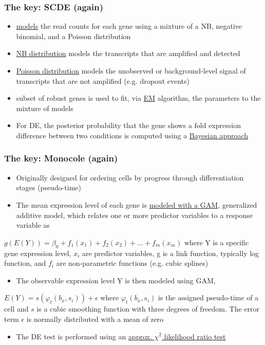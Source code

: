 \documentclass{beamer}\usepackage[]{graphicx}\usepackage[]{color}
\begin{document}
\begin{frame}
\frametitle{The key: SCDE (again)}
\begin{itemize}
  \item \underline{models} the read counts for each gene using a mixture of a NB, negative binomial, and a Poisson distribution 
  \item \underline{NB distribution} models the transcripts that are amplified and detected
  \item \underline{Poisson distribution} models the unobserved or background-level signal of transcripts that are not amplified (e.g. dropout events)
  \item subset of robust genes is used to fit, via \underline{EM} algorithm, the parameters to the mixture of models
  \item For DE, the posterior probability that the gene shows a fold expression difference between two conditions is computed using a \underline{Bayesian approach}
\end{itemize}
\end{frame}

\begin{frame}
\frametitle{The key: Monocole (again)}
\begin{itemize}
\item Originally designed for ordering cells by progress through differentiation stages (pseudo-time)
\item The mean expression level of each gene is \underline{modeled with a GAM}, generalized additive model, which relates one or more predictor variables to a response variable as  
\end{itemize}
   \begin{center}
    $g(E(Y))=\beta_0+f_1(x_1)+f_2(x_2)+...+f_m(x_m)$ where Y is a specific gene expression level, $x_i$ are predictor variables, g is a link function, typically log function, and $f_i$ are non-parametric functions (e.g. cubic splines)
  \end{center}
\begin{itemize}  
\item The observable expression level Y is then modeled using GAM, 
\end{itemize}
$E(Y)=s(\varphi_t(b_x, s_i))+\epsilon$ where $\varphi_t(b_x, s_i)$ is the assigned pseudo-time of a cell and $s$ is a cubic smoothing function with three degrees of freedom. The error term $\epsilon$ is normally distributed with a mean of zero
\begin{itemize}
\item The DE test is performed using an \underline{approx. $\chi^2$ likelihood ratio test}
\end{itemize}
\end{frame}
\end{document}
